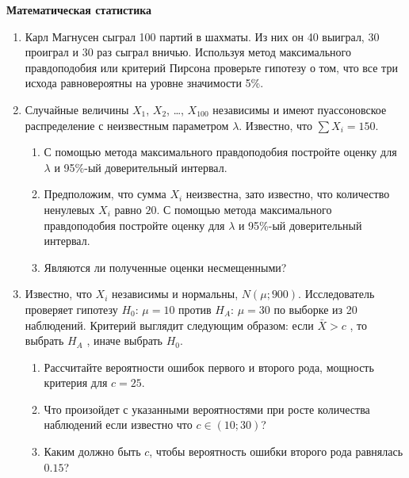 \textbf{Математическая статистика}

\begin{enumerate}[resume]


\item Карл Магнусен сыграл 100 партий в шахматы. Из них он 40 выиграл, 30 проиграл и 30 раз сыграл вничью. Используя метод максимального правдоподобия или критерий Пирсона проверьте гипотезу о том, что все три исхода равновероятны на уровне значимости 5\%.


\item Случайные величины $X_1$, $X_2$, \ldots, $X_{100}$ независимы и имеют пуассоновское распределение с неизвестным параметром $\lambda$. Известно, что $\sum X_i = 150$.
\begin{enumerate}
\item С помощью метода максимального правдоподобия постройте оценку для $\lambda$ и 95\%-ый доверительный интервал.
\item Предположим, что сумма  $X_i$ неизвестна, зато известно, что количество ненулевых $X_i$ равно $20$.  С помощью метода максимального правдоподобия постройте оценку для $\lambda$ и 95\%-ый доверительный интервал.
\item Являются ли полученные оценки несмещенными?
\end{enumerate}


\item  Известно, что  $X_{i}$ независимы и нормальны, $N\left(\mu ;900\right)$.
Исследователь проверяет гипотезу $H_{0}$: $\mu =10$  против
$H_{A}$: $\mu =30$  по выборке из 20 наблюдений. Критерий выглядит
следующим образом: если  $\bar{X}>c$ , то выбрать  $H_{A} $ ,
иначе выбрать  $H_{0} $.
\begin{enumerate}
\item  Рассчитайте вероятности ошибок
первого и второго рода, мощность критерия для $c=25$.
\item Что произойдет с указанными вероятностями при росте количества
наблюдений если известно что $c\in(10;30)$?
\item Каким должно быть $c$, чтобы вероятность ошибки второго рода
равнялась $0.15$?
\end{enumerate}
\end{enumerate}
